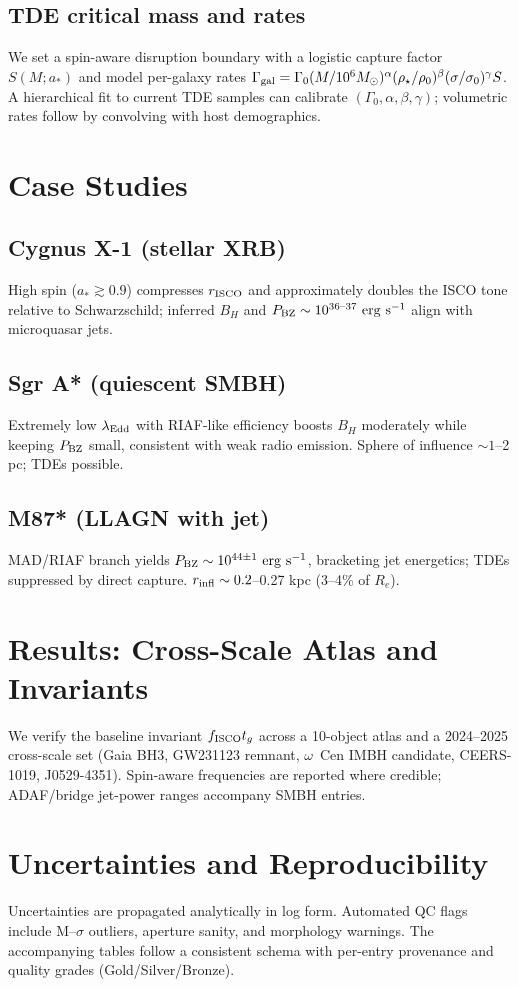 \documentclass[11pt]{article}
\begin{document}
\subsection{TDE critical mass and rates}
We set a spin-aware disruption boundary with a logistic capture factor $S(M;a_*)$ and model per-galaxy rates $\Gamma_{\rm gal}=\Gamma_0(M/10^6M_\odot)^{\alpha}(\rho_\star/\rho_0)^{\beta}(\sigma/\sigma_0)^{\gamma}S$. A hierarchical fit to current TDE samples can calibrate $(\Gamma_0,\alpha,\beta,\gamma)$; volumetric rates follow by convolving with host demographics.

\section{Case Studies}
\subsection{Cygnus X-1 (stellar XRB)}
High spin ($a_*\gtrsim 0.9$) compresses $r_{\rm ISCO}$ and approximately doubles the ISCO tone relative to Schwarzschild; inferred $B_H$ and $P_{\rm BZ}\sim 10^{36\text{--}37}\ \mathrm{erg\ s^{-1}}$ align with microquasar jets.
\subsection{Sgr A* (quiescent SMBH)}
Extremely low $\lambda_{\rm Edd}$ with RIAF-like efficiency boosts $B_H$ moderately while keeping $P_{\rm BZ}$ small, consistent with weak radio emission. Sphere of influence $\sim 1$--2 pc; TDEs possible.
\subsection{M87* (LLAGN with jet)}
MAD/RIAF branch yields $P_{\rm BZ}\sim 10^{44\pm 1}\ \mathrm{erg\ s^{-1}}$, bracketing jet energetics; TDEs suppressed by direct capture. $r_{\rm infl}\sim 0.2$--0.27 kpc (3--4\% of $R_e$).

\section{Results: Cross-Scale Atlas and Invariants}
We verify the baseline invariant $f_{\rm ISCO}t_g$ across a 10-object atlas and a 2024--2025 cross-scale set (Gaia BH3, GW231123 remnant, $\omega$~Cen IMBH candidate, CEERS-1019, J0529-4351). Spin-aware frequencies are reported where credible; ADAF/bridge jet-power ranges accompany SMBH entries.

\section{Uncertainties and Reproducibility}
Uncertainties are propagated analytically in log form. Automated QC flags include M--$\sigma$ outliers, aperture sanity, and morphology warnings. The accompanying tables follow a consistent schema with per-entry provenance and quality grades (Gold/Silver/Bronze).
\end{document}
